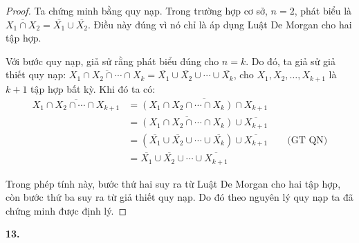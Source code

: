 \documentclass[12pt,a4paper]{article}
\theoremstyle{definition}
\begin{document}
\begin{proof}
Ta chứng minh bằng quy nạp. Trong trường hợp cơ sở, $n = 2$, phát biểu là $\overline{X_1 \cap X_2} = \overline{X_1} \cup \overline{X_2}$. Điều này đúng vì nó chỉ là áp dụng Luật De Morgan cho hai tập hợp.

Với bước quy nạp, giả sử rằng phát biểu đúng cho $n = k$. Do đó, ta giả sử giả thiết quy nạp: $\overline{X_1 \cap X_2 \cap \cdots \cap X_k} = \overline{X_1} \cup \overline{X_2} \cup \cdots \cup \overline{X_k}$, cho $X_1, X_2, \ldots, X_{k+1}$ là $k + 1$ tập hợp bất kỳ. Khi đó ta có:
\begin{align*}
\overline{X_1 \cap X_2 \cap \cdots \cap X_{k+1}} &= \overline{(X_1 \cap X_2 \cap \cdots \cap X_k) \cap X_{k+1}} \\
&= \overline{(X_1 \cap X_2 \cap \cdots \cap X_k)} \cup \overline{X_{k+1}} \\
&= (\overline{X_1} \cup \overline{X_2} \cup \cdots \cup \overline{X_k}) \cup \overline{X_{k+1}} \qquad \text{(GT QN)}\\
&= \overline{X_1} \cup \overline{X_2} \cup \cdots \cup \overline{X_{k+1}}
\end{align*}

Trong phép tính này, bước thứ hai suy ra từ Luật De Morgan cho hai tập hợp, còn bước thứ ba suy ra từ giả thiết quy nạp. Do đó theo nguyên lý quy nạp ta đã chứng minh được định lý.
\end{proof}

\bigskip
\textbf{13.}
\end{document}

